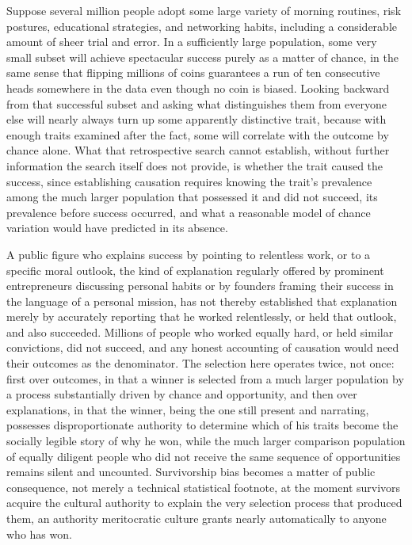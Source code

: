 \documentclass[11pt]{article}
\begin{document}
Suppose several million people adopt some large variety of morning routines, risk postures, educational strategies, and networking habits, including a considerable amount of sheer trial and error. In a sufficiently large population, some very small subset will achieve spectacular success purely as a matter of chance, in the same sense that flipping millions of coins guarantees a run of ten consecutive heads somewhere in the data even though no coin is biased. Looking backward from that successful subset and asking what distinguishes them from everyone else will nearly always turn up some apparently distinctive trait, because with enough traits examined after the fact, some will correlate with the outcome by chance alone. What that retrospective search cannot establish, without further information the search itself does not provide, is whether the trait caused the success, since establishing causation requires knowing the trait's prevalence among the much larger population that possessed it and did not succeed, its prevalence before success occurred, and what a reasonable model of chance variation would have predicted in its absence.

A public figure who explains success by pointing to relentless work, or to a specific moral outlook, the kind of explanation regularly offered by prominent entrepreneurs discussing personal habits or by founders framing their success in the language of a personal mission, has not thereby established that explanation merely by accurately reporting that he worked relentlessly, or held that outlook, and also succeeded. Millions of people who worked equally hard, or held similar convictions, did not succeed, and any honest accounting of causation would need their outcomes as the denominator. The selection here operates twice, not once: first over outcomes, in that a winner is selected from a much larger population by a process substantially driven by chance and opportunity, and then over explanations, in that the winner, being the one still present and narrating, possesses disproportionate authority to determine which of his traits become the socially legible story of why he won, while the much larger comparison population of equally diligent people who did not receive the same sequence of opportunities remains silent and uncounted. Survivorship bias becomes a matter of public consequence, not merely a technical statistical footnote, at the moment survivors acquire the cultural authority to explain the very selection process that produced them, an authority meritocratic culture grants nearly automatically to anyone who has won.
\end{document}
